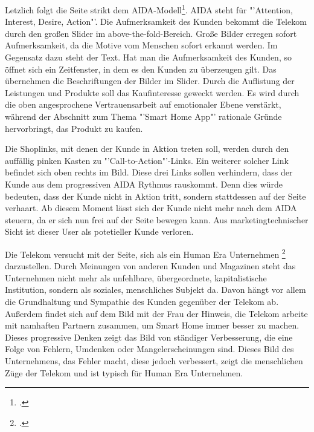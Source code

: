 Letzlich folgt die Seite strikt dem AIDA-Modell\footcite[vgl.][]{AIDA}. AIDA steht für "'Attention, Interest, Desire, Action"'. Die Aufmerksamkeit des Kunden bekommt die Telekom durch den großen Slider im above-the-fold-Bereich. Große Bilder erregen sofort Aufmerksamkeit, da die Motive vom Menschen sofort erkannt werden. Im Gegensatz dazu steht der Text. Hat man die Aufmerksamkeit des Kunden, so öffnet sich ein Zeitfenster, in dem es den Kunden zu überzeugen gilt. Das übernehmen die Beschriftungen der Bilder im Slider. Durch die Auflistung der Leistungen und Produkte soll das Kaufinteresse geweckt werden. Es wird durch die oben angesprochene Vertrauensarbeit auf emotionaler Ebene verstärkt, während der Abschnitt zum Thema "'Smart Home App"' rationale Gründe hervorbringt, das Produkt zu kaufen.

Die Shoplinks, mit denen der Kunde in Aktion treten soll, werden durch den auffällig pinken Kasten zu "'Call-to-Action"'-Links. Ein weiterer solcher Link befindet sich oben rechts im Bild. Diese drei Links sollen verhindern, dass der Kunde aus dem progressiven AIDA Rythmus rauskommt. Denn dies würde bedeuten, dass der Kunde nicht in Aktion tritt, sondern stattdessen auf der Seite verhaart. Ab diesem Moment lässt sich der Kunde nicht mehr nach dem AIDA steuern, da er sich nun frei auf der Seite bewegen kann. Aus marketingtechnischer Sicht ist dieser User als potetieller Kunde verloren.

Die Telekom versucht mit der Seite, sich als ein Human Era Unternehmen \footcite[vgl.][]{humanEra} darzustellen. Durch Meinungen von anderen Kunden und Magazinen steht das Unternehmen nicht mehr als unfehlbare, übergeordnete, kapitalistische Institution, sondern als soziales, menschliches Subjekt da. Davon hängt vor allem die Grundhaltung und Sympathie des Kunden gegenüber der Telekom ab. Außerdem findet sich auf dem Bild mit der Frau der Hinweis, die Telekom arbeite mit namhaften Partnern zusammen, um Smart Home immer besser zu machen. Dieses progressive Denken zeigt das Bild von ständiger Verbesserung, die eine Folge von Fehlern, Umdenken oder Mangelerscheinungen sind. Dieses Bild des Unternehmens, das Fehler macht, diese jedoch verbessert, zeigt die menschlichen Züge der Telekom und ist typisch für Human Era Unternehmen.

